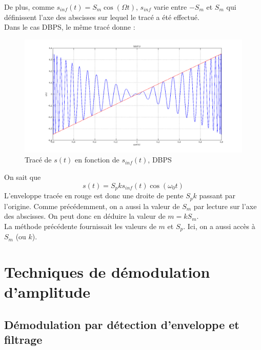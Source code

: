 \documentclass[../../Cours_M1.tex]{subfiles}
\begin{document}
\begin{itemize}
De plus, comme $s_{inf}(t)=S_m\cos(\Omega t)$, $s_{inf}$ varie entre $-S_m$ et $S_m$ qui définissent l'axe des abscisses sur lequel le tracé a été effectué.\\

Dans le cas DBPS, le même tracé donne :
\begin{figure}[h!]
\centering
\includegraphics[scale=0.4]{DBPSXY.png}
\caption{Tracé de $s(t)$ en fonction de $s_{inf}(t)$, DBPS}
\end{figure}

On sait que \[s(t) = S_pks_{inf}(t)\cos(\omega_0 t)\]
L'enveloppe tracée en rouge est donc une droite de pente $S_pk$ passant par l'origine. Comme précédemment, on a aussi la valeur de $S_m$ par lecture sur l'axe des abscisses. On peut donc en déduire la valeur de $m=kS_m$.\\

La méthode précédente fournissait les valeurs de $m$ et $S_p$. Ici, on a aussi accès à $S_m$ (ou $k$).
\end{itemize}

\section{Techniques de démodulation d'amplitude}

\subsection{Démodulation par détection d'enveloppe et filtrage}
\end{document}
